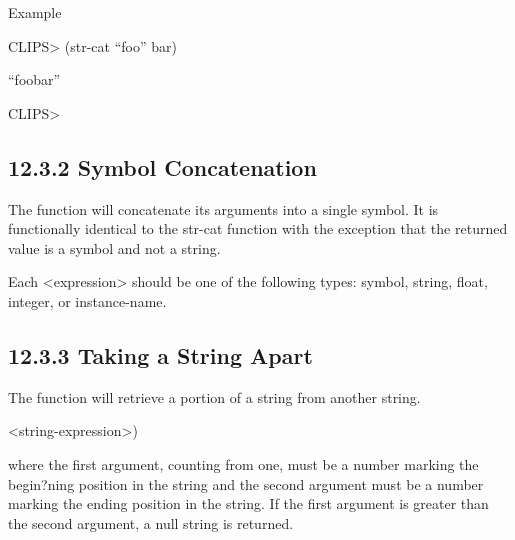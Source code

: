 \documentclass[letterpaper,10pt,english]{sphinxmanual}
\begin{document}
Example

CLIPS\textgreater{} (str-cat “foo” bar)

“foobar”

CLIPS\textgreater{}


\subsection{12.3.2 Symbol Concatenation}
\label{\detokenize{actions:symbol-concatenation}}
The  function will concatenate its arguments into a single
symbol. It is functionally identical to the str-cat function with the
exception that the returned value is a symbol and not a string.


\begin{sphinxVerbatim}[commandchars=\\\{\}]
 
\end{sphinxVerbatim}

Each \textless{}expression\textgreater{} should be one of the following types: symbol, string,
float, integer, or instance-name.


\subsection{12.3.3 Taking a String Apart}
\label{\detokenize{actions:taking-a-string-apart}}
The  function will retrieve a portion of a string from
another string.


\begin{sphinxVerbatim}[commandchars=\\\{\}]
  
\end{sphinxVerbatim}

\textless{}string-expression\textgreater{})

where the first argument, counting from one, must be a number marking
the begin?ning position in the string and the second argument must be a
number marking the ending position in the string. If the first argument
is greater than the second argument, a null string is returned.
\end{document}

